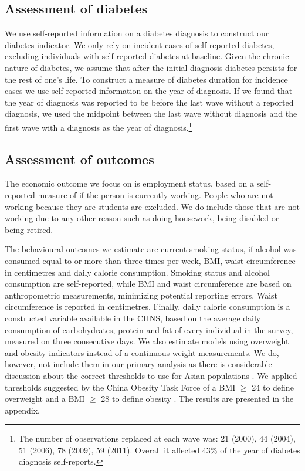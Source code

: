 \subsection{Assessment of diabetes}

We use self-reported information on a diabetes diagnosis to construct our diabetes indicator. We only rely on incident cases of self-reported diabetes, excluding individuals with self-reported diabetes at baseline. Given the chronic nature of diabetes, we assume that after the initial diagnosis diabetes persists for the rest of one's life. To construct a measure of diabetes duration for incidence cases we use self-reported information on the year of diagnosis. If we found that the year of diagnosis was reported to be before the last wave without a reported diagnosis, we used the midpoint between the last wave without diagnosis and the first wave with a diagnosis as the year of diagnosis.\footnote{The number of observations replaced at each wave was: 21 (2000), 44 (2004), 51  (2006), 78 (2009), 59 (2011). Overall it affected 43\% of the year of diabetes diagnosis self-reports.}

\subsection{Assessment of outcomes}

The economic outcome we focus on is employment status, based on a self-reported measure of if the person is currently working. People who are not working because they are students are excluded. We do include those that are not working due to any other reason such as doing housework, being disabled or being retired. 

The behavioural outcomes we estimate are current smoking status, if alcohol was consumed equal to or more than three times per week, \ac{BMI}, waist circumference in centimetres and daily calorie consumption. Smoking status and alcohol consumption are self-reported, while \ac{BMI} and waist circumference are based on anthropometric measurements, minimizing potential reporting errors. Waist circumference is reported in centimetres. Finally, daily calorie consumption is a constructed variable available in the \ac{CHNS}, based on the average daily consumption of carbohydrates, protein and fat of every individual in the survey, measured on three consecutive days. We also estimate models using overweight and obesity indicators instead of a continuous weight measurements. We do, however, not include them in our primary analysis as there is considerable discussion about the correct thresholds to use for Asian populations \parencite{WHO2004,He2015,Zeng2014a}. We applied thresholds suggested by the China Obesity Task Force of a \ac{BMI} $\geq$ 24 to define overweight and a \ac{BMI} $\geq$ 28 to define obesity \parencite{group2004body}. The results are presented in the appendix.


